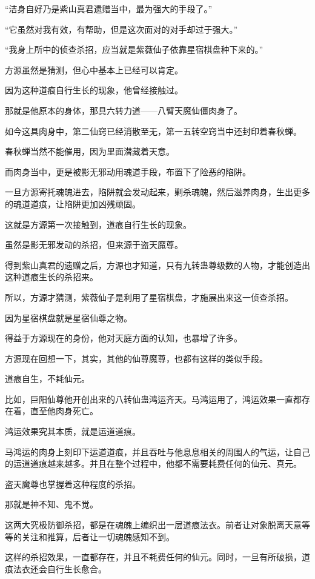 \begin{this_body}
“洁身自好乃是紫山真君遗赠当中，最为强大的手段了。”

“它虽然对我有效，有帮助，但是这次面对的对手却过于强大。”

“我身上所中的侦查杀招，应当就是紫薇仙子依靠星宿棋盘种下来的。”

方源虽然是猜测，但心中基本上已经可以肯定。

因为这种道痕自行生长的现象，他曾经接触过。

那就是他原本的身体，那具六转力道——八臂天魔仙僵肉身了。

如今这具肉身中，第二仙窍已经消散至无，第一五转空窍当中还封印着春秋蝉。

春秋蝉当然不能催用，因为里面潜藏着天意。

而肉身当中，更是被影无邪动用魂道手段，布置下了险恶的陷阱。

一旦方源寄托魂魄进去，陷阱就会发动起来，剿杀魂魄，然后滋养肉身，生出更多的魂道道痕，让陷阱更加凶残顽固。

这就是方源第一次接触到，道痕自行生长的现象。

虽然是影无邪发动的杀招，但来源于盗天魔尊。

得到紫山真君的遗赠之后，方源也才知道，只有九转蛊尊级数的人物，才能创造出这种道痕生长的杀招来。

所以，方源才猜测，紫薇仙子是利用了星宿棋盘，才施展出来这一侦查杀招。

因为星宿棋盘就是星宿仙尊之物。

得益于方源现在的身份，他对天庭方面的认知，也暴增了许多。

方源现在回想一下，其实，其他的仙尊魔尊，也都有这样的类似手段。

道痕自生，不耗仙元。

比如，巨阳仙尊他开创出来的八转仙蛊鸿运齐天。马鸿运用了，鸿运效果一直都存在着，直至他肉身死亡。

鸿运效果究其本质，就是运道道痕。

马鸿运的肉身上刻印下运道道痕，并且吞吐与他息息相关的周围人的气运，让自己的运道道痕越来越多。并且在整个过程中，他都不需要耗费任何的仙元、真元。

盗天魔尊也掌握着这种程度的杀招。

那就是神不知、鬼不觉。

这两大究极防御杀招，都是在魂魄上编织出一层道痕法衣。前者让对象脱离天意等等的关注和推算，后者让一切魂魄感知不到。

这样的杀招效果，一直都存在，并且不耗费任何的仙元。同时，一旦有所破损，道痕法衣还会自行生长愈合。


\end{this_body}
